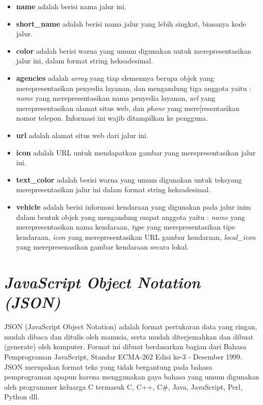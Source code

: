\begin{itemize}
	\item \textbf{name} adalah berisi nama jalur ini.
	\item \textbf{short\_name} adalah berisi nama jalur yang lebih singkat, biasanya kode jalur.
	\item \textbf{color} adalah berisi warna yang umum digunakan untuk merepresentasikan jalur ini, dalam format string heksadesimal.
	\item \textbf{agencies} adalah \textit{array} yang tiap elemennya berupa objek yang merepresentasikan penyedia layanan, dan mengandung tiga anggota yaitu : \textit{name} yang merepresentasikan nama penyedia layanan, \textit{url} yang merepresentasikan alamat situs web, dan \textit{phone} yang mere[resentasikan nomor telepon. Informasi ini wajib ditampilkan ke pengguna.
	\item \textbf{url} adalah alamat situs web dari jalur ini.
	\item \textbf{icon} adalah URL untuk mendapatkan gambar yang merepresentasikan jalur ini.
	\item \textbf{text\_color} adalah berisi warna yang umum digunakan untuk teksyang merepresentasikan jalur ini dalam format string heksadesimal.
	\item \textbf{vehicle} adalah berisi informasi kendaraan yang digunakan pada jalur inim dalam bentuk objek yang mengandung empat anggota yaitu : \textit{name} yang merepresentasikan nama kendaraan, \textit{type} yang merepresentasikan tipe kendaraan, \textit{icon} yang merepresentasikan URL gambar kendaraan, \textit{local\_icon} yang merepresenasikan gambar kendaraan secara lokal.
\end{itemize}

\section{\textit{JavaScript Object Notation (JSON)}}
\label{sec:json}
JSON (JavaScript Object Notation) adalah format pertukaran data yang ringan, mudah dibaca dan ditulis oleh manusia, serta mudah diterjemahkan dan dibuat (generate) oleh komputer. Format ini dibuat berdasarkan bagian dari Bahasa Pemprograman JavaScript, Standar ECMA-262 Edisi ke-3 - Desember 1999. JSON merupakan format teks yang tidak bergantung pada bahasa pemprograman apapun karena menggunakan gaya bahasa yang umum digunakan oleh programmer keluarga C termasuk C, C++, C\#, Java, JavaScript, Perl, Python dll\cite{ecmainternational2013}.

